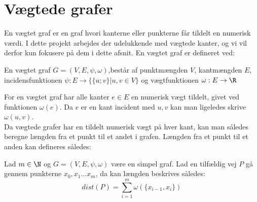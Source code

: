 \section{Vægtede grafer}
En vægtet graf er en graf hvori kanterne eller punkterne får tildelt en numerisk værdi. I dette projekt arbejdes der udelukkende med vægtede kanter, og vi vil derfor kun fokusere på dem i dette afsnit.
En vægtet graf er defineret ved:
\begin{defn}
En vægtet graf $G=(V,E,\psi,\omega)$,består af punktmængden $V$, kantmængden $E$, incidensfunktionen $\psi: E \rightarrow \{\{u;v\}|u,v \in V\}$ og vægtfunktionen $\omega: E \rightarrow \R$
\end{defn}
For en vægtet graf har alle kanter $e\in E$ en numerisk vægt tildelt, givet ved funktionen $\omega (e)$. Da $e$ er en kant incident med ${u,v}$ kan man  ligeledes skrive $\omega (u,v)$.
\\ Da vægtede grafer har en tildelt numerisk vægt på hver kant, kan man således beregne længden fra et punkt til et andet i grafen. Længden fra et punkt til et anden kan defineres således:
\begin{defn}
Lad $m\in \N$ og $G=(V,E,\psi,\omega)$ være en simpel graf. Lad en tilfældig vej $P$ gå gennem punkterne $x_0,x_1...x_m$, da kan længden beskrives således:
	\begin{equation}
	dist(P)=\sum_{i=1}^{m}\omega(\{x_{i-1},x_i\})
	\end{equation}  
\end{defn}

